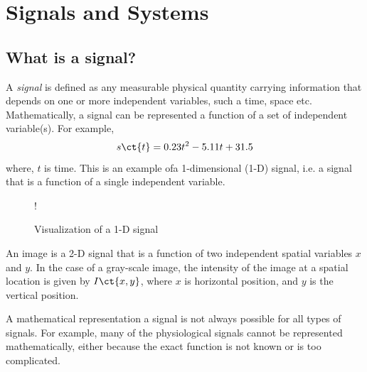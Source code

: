 
\chapter{Signals and Systems}


\section{What is a signal?}
A \textit{signal} is defined as any measurable physical quantity carrying information that depends on one or more independent variables, such a time, space etc. Mathematically, a signal can be represented a function of a set of independent variable(s). For example,
\[ s\ct{t} = 0.23t^2 - 5.11t + 31.5 \]
where, $t$ is time. This is an example ofa  1-dimensional (1-D) signal, i.e. a signal that is a function of a single independent variable. 

\begin{figure}[h!]
    \centering
    \resizebox {\columnwidth} {!} {
    }
    \caption{Visualization of a 1-D signal} \label{fig:ch1_signal_1d}
\end{figure}

An image is a 2-D signal that is a function of two independent spatial variables $x$ and $y$. In the case of a gray-scale image, the intensity of the image at a spatial location is given by $I\ct{x, y}$, where $x$ is horizontal position, and $y$ is the vertical position.

A mathematical representation a signal is not always possible for all types of signals. For example, many of the physiological signals cannot be represented mathematically, either because the exact function is not known or is too complicated.

